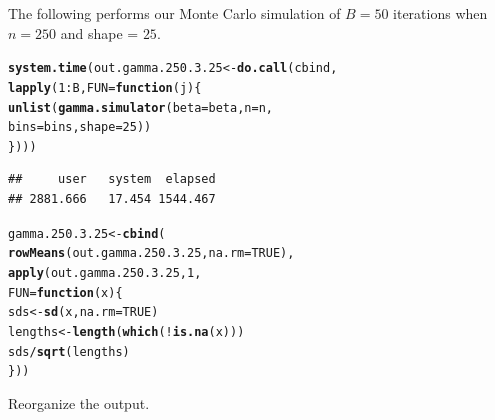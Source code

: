 \documentclass[11pt]{article}\usepackage[]{graphicx}\usepackage[]{color}
\makeatletter
\newcommand{\hlnum}[1]{\textcolor[rgb]{0.686,0.059,0.569}{#1}}%
\newcommand{\hlopt}[1]{\textcolor[rgb]{0,0,0}{#1}}%
\newcommand{\hlstd}[1]{\textcolor[rgb]{0.345,0.345,0.345}{#1}}%
\newcommand{\hlkwa}[1]{\textcolor[rgb]{0.161,0.373,0.58}{\textbf{#1}}}%
\newcommand{\hlkwb}[1]{\textcolor[rgb]{0.69,0.353,0.396}{#1}}%
\newcommand{\hlkwc}[1]{\textcolor[rgb]{0.333,0.667,0.333}{#1}}%
\newcommand{\hlkwd}[1]{\textcolor[rgb]{0.737,0.353,0.396}{\textbf{#1}}}%
\newenvironment{kframe}{%
 \def\at@end@of@kframe{}%
 \ifinner\ifhmode%
  \def\at@end@of@kframe{\end{minipage}}%
  \begin{minipage}{\columnwidth}%
 \fi\fi%
 \def\FrameCommand##1{\hskip\@totalleftmargin \hskip-\fboxsep
 \colorbox{shadecolor}{##1}\hskip-\fboxsep
     \hskip-\linewidth \hskip-\@totalleftmargin \hskip\columnwidth}%
 \MakeFramed {\advance\hsize-\width
   \@totalleftmargin\z@ \linewidth\hsize
   \@setminipage}}%
 {\par\unskip\endMakeFramed%
 \at@end@of@kframe}
\newenvironment{knitrout}{}{} %
\makeatother
\begin{document}
The following performs our Monte Carlo simulation of $B = 50$ iterations 
when $n = 250$ and shape = $25$.

\begin{knitrout}
\color{fgcolor}\begin{kframe}
\begin{alltt}
\hlkwd{system.time}\hlstd{(out.gamma.250.3.25} \hlkwb{<-} \hlkwd{do.call}\hlstd{(cbind,}
  \hlkwd{lapply}\hlstd{(}\hlnum{1}\hlopt{:}\hlstd{B,} \hlkwc{FUN} \hlstd{=} \hlkwa{function}\hlstd{(}\hlkwc{j}\hlstd{)\{}
    \hlkwd{unlist}\hlstd{(}\hlkwd{gamma.simulator}\hlstd{(}\hlkwc{beta} \hlstd{= beta,} \hlkwc{n} \hlstd{= n,}
      \hlkwc{bins} \hlstd{= bins,} \hlkwc{shape} \hlstd{=} \hlnum{25}\hlstd{))}
\hlstd{\})))}
\end{alltt}
\begin{verbatim}
##     user   system  elapsed 
## 2881.666   17.454 1544.467
\end{verbatim}
\end{kframe}
\end{knitrout}

\begin{knitrout}
\color{fgcolor}\begin{kframe}
\begin{alltt}
\hlstd{gamma.250.3.25} \hlkwb{<-} \hlkwd{cbind}\hlstd{(}
  \hlkwd{rowMeans}\hlstd{(out.gamma.250.3.25,} \hlkwc{na.rm} \hlstd{=} \hlnum{TRUE}\hlstd{),}
  \hlkwd{apply}\hlstd{(out.gamma.250.3.25,} \hlnum{1}\hlstd{,}
  \hlkwc{FUN} \hlstd{=} \hlkwa{function}\hlstd{(}\hlkwc{x}\hlstd{)\{}
    \hlstd{sds} \hlkwb{<-} \hlkwd{sd}\hlstd{(x,} \hlkwc{na.rm} \hlstd{=} \hlnum{TRUE}\hlstd{)}
    \hlstd{lengths} \hlkwb{<-} \hlkwd{length}\hlstd{(}\hlkwd{which}\hlstd{(}\hlopt{!}\hlkwd{is.na}\hlstd{(x)))}
    \hlstd{sds} \hlopt{/} \hlkwd{sqrt}\hlstd{(lengths)}
  \hlstd{\}))}
\end{alltt}
\end{kframe}
\end{knitrout}

Reorganize the output.
\end{document}
